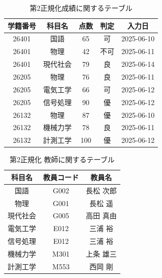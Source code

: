 \documentclass[a4paper,11pt]{ltjsarticle}
\begin{document}
\begin{table}[htbp]
  \centering
  \caption{第2正規化成績に関するテーブル}
  \label{tab:normalized2_subject}
  \begin{tabular}{|c|c|c|c|c|}
    \hline
    \textbf{学籍番号} & \textbf{科目名} & \textbf{点数} & \textbf{判定} & \textbf{入力日} \\
    \hline

    26401         & 国語           & 65          & 可           & 2025-06-10   \\
    \hline
    26401         & 物理           & 42          & 不可          & 2025-06-11   \\
    \hline
    26401         & 現代社会         & 79          & 良           & 2025-06-14   \\
    \hline

    26205         & 物理           & 76          & 良           & 2025-06-11   \\
    \hline
    26205         & 電気工学         & 66          & 可           & 2025-06-12   \\
    \hline
    26205         & 信号処理         & 90          & 優           & 2025-06-12   \\
    \hline

    26132         & 物理           & 87          & 優           & 2025-06-10   \\
    \hline
    26132         & 機械力学         & 78          & 良           & 2025-06-11   \\
    \hline
    26132         & 計測工学         & 100         & 優           & 2025-06-12   \\
    \hline
  \end{tabular}
\end{table}
\begin{table}[htbp]
  \centering
  \caption{第2正規化 教師に関するテーブル}
  \label{tab:normalized2_teacher}
  \begin{tabular}{|c|c|c|}
    \hline
    \textbf{科目名} & \textbf{教員コード} & \textbf{教員名} \\
    \hline

    国語           & G002           & 長松 次郎        \\ \hline
    物理           & G001           & 長松 遥         \\ \hline
    現代社会         & G005           & 高田 真由        \\
    \hline

    電気工学         & E012           & 三浦 裕         \\ \hline
    信号処理         & E012           & 三浦 裕         \\
    \hline

    機械力学         & M301           & 上条 雄三        \\ \hline
    計測工学         & M553           & 西岡 剛         \\
    \hline
  \end{tabular}
\end{table}
\end{document}
